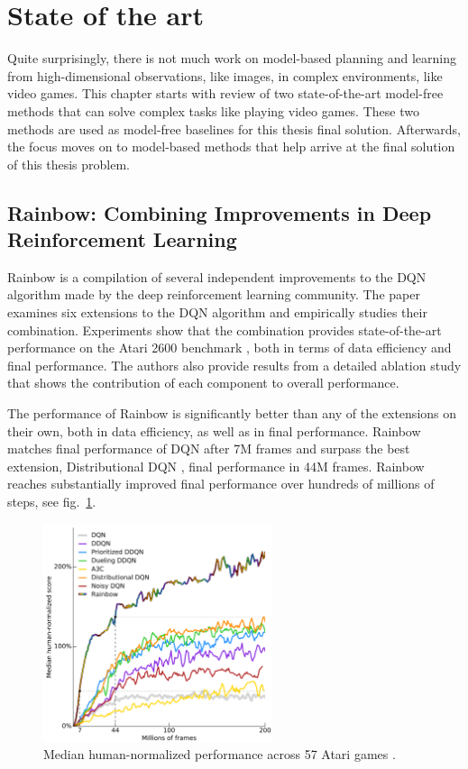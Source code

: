 \section{State of the art}

Quite surprisingly, there is not much work on model-based planning and learning from high-dimensional observations, like images, in complex environments, like video games. This chapter starts with review of two state-of-the-art model-free methods that can solve complex tasks like playing video games. These two methods are used as model-free baselines for this thesis final solution. Afterwards, the focus moves on to model-based methods that help arrive at the final solution of this thesis problem.

\subsection{Rainbow: Combining Improvements in Deep Reinforcement Learning}

Rainbow \cite{Algo.Rainbow} is a compilation of several independent improvements to the DQN \cite{Algo.DQN} algorithm made by the deep reinforcement learning community. The paper examines six extensions \cite{Algo.DDQN}\cite{Algo.PrioritizedDDQN}\cite{Algo.DuelingDDQN}\cite{Algo.A3C}\cite{Algo.DistDQN}\cite{Algo.NoisyNets} to the DQN algorithm and empirically studies their combination. Experiments show that the combination provides state-of-the-art performance on the Atari 2600 benchmark \cite{Code.ALE}, both in terms of data efficiency and final performance. The authors also provide results from a detailed ablation study that shows the contribution of each component to overall performance.

The performance of Rainbow is significantly better than any of the extensions on their own, both in data efficiency, as well as in final performance. Rainbow matches final performance of DQN after 7M frames and surpass the best extension, Distributional DQN \cite{Algo.DistDQN}, final performance in 44M frames. Rainbow reaches substantially improved final performance over hundreds of millions of steps, see fig.~\ref{Fig.Rainbow}.

\begin{figure}[H]
\includegraphics[width=0.6\textwidth,keepaspectratio]{figures/Rainbow.png}
\caption[Rainbow performance]{Median human-normalized performance across 57 Atari games \protect\cite{Algo.Rainbow}.}
\label{Fig.Rainbow}
\end{figure}

